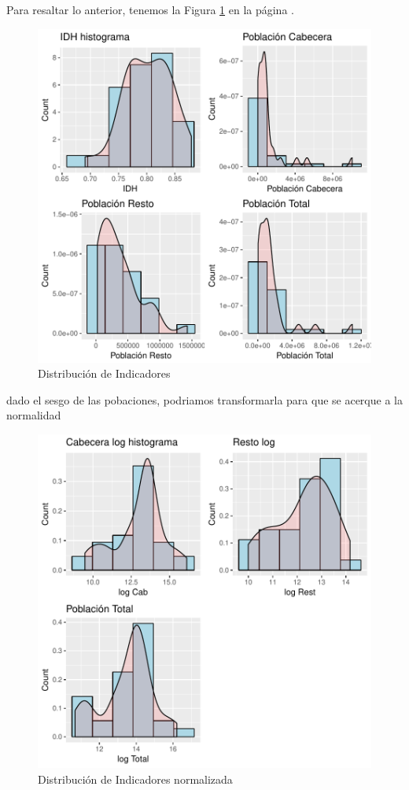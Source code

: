 \documentclass{article}
\begin{document}
% 
 Para resaltar lo anterior, tenemos la Figura \ref{barplots} en la página \pageref{barplots}. 
% 
%  
\begin{figure}[h]
\centering
\includegraphics{ProyectoHC-barplots}
\caption{Distribución de Indicadores}
\label{barplots}
\end{figure}

dado el sesgo de las pobaciones, podriamos transformarla para que se acerque a la  normalidad
\clearpage
 \begin{figure}[h]
\centering
\includegraphics{ProyectoHC-barplots2}
\caption{Distribución de Indicadores normalizada}
\label{barplots2}
\end{figure}
\clearpage
% 
% 
\end{document}
